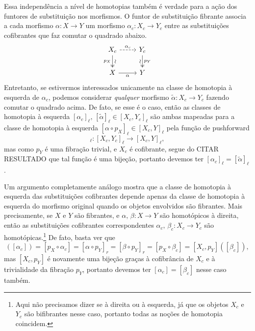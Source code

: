Essa independência a nível de homotopias também é verdade para a ação dos funtores de substituição nos morfismos.
O funtor de substituição fibrante associa a cada morfismo $\alpha: X \to Y$ um morfismo $\alpha_{c}: X_{c} \to Y_{c}$ entre as substituições cofibrantes que faz comutar o quadrado abaixo.
\begin{displaymath}
  \begin{tikzcd}
    X_{c}
    \arrow[r, dashed, "\alpha_{c}"]
    \arrow[d, two heads, "\sim" {sloped}, "p_{X}" {swap}]
    & Y_{c}
    \arrow[d, two heads, "p_{Y}", "\sim" {swap,sloped}]
    \\ X
    \arrow[r, "\alpha" swap]
    & Y
  \end{tikzcd}
\end{displaymath}
Entretanto, se estivermos interessados unicamente na classe de homotopia à esquerda de $\alpha_{c}$, podemos considerar \emph{qualquer} morfismo $\widetilde{\alpha}: X_{c} \to Y_{c}$ fazendo comutar o quadrado acima.
De fato, se esse é o caso, então as classes de homotopia à esquerda $[\alpha_{c}]_{\ell},\, [\widetilde{\alpha}]_{\ell} \in [X_{c},Y_{c}]_{\ell}$ são ambas mapeadas para a classe de homotopia à esquerda $[\alpha \circ p_{X}]_{\ell} \in [X_{c},Y]_{\ell}$ pela função de pushforward
\begin{displaymath}
  [X_{c},p_{Y}]_{\ell}: [X_{c},Y_{c}]_{\ell} \to [X_{c},Y]_{\ell},
\end{displaymath}
mas como $p_{Y}$ é uma fibração trivial, e $X_{c}$ é cofibrante, segue do CITAR RESULTADO que tal função é uma bijeção, portanto devemos ter $[\alpha_{c}]_{\ell} = [\widetilde{\alpha}]_{\ell}$.

Um argumento completamente análogo mostra que a classe de homotopia à esquerda das substituições cofibrantes depende apenas da classe de homotopia à esquerda do morfismo original quando os objetos envolvidos são fibrantes.
Mais precisamente, se $X$ e $Y$ são fibrantes, e $\alpha,\, \beta: X \to Y$ são homotópicos à direita, então as substituições cofibrantes correspondentes $\alpha_{c},\, \beta_{c}: X_{c} \to Y_{c}$ são homotópicas.\footnote{Aqui não precisamos dizer se à direita ou à esquerda, já que os objetos $X_{c}$ e $Y_{c}$ são bifibrantes nesse caso, portanto todas as noções de homotopia coincidem.}
De fato, basta ver que
\begin{displaymath}
  [X_{c},p_{Y}]([\alpha_{c}]) = [p_{X} \circ \alpha_{c}] = [\alpha \circ p_{Y}]_{r} = [\beta \circ p_{Y}]_{r} = [p_{X} \circ \beta_{c}] = [X_{c},p_{Y}]([\beta_{c}]),
\end{displaymath}
mas $[X_{c},p_{Y}]$ é novamente uma bijeção graças à cofibrância de $X_{c}$ e à trivialidade da fibração $p_{Y}$, portanto devemos ter $[\alpha_{c}] = [\beta_{c}]$ nesse caso também.


